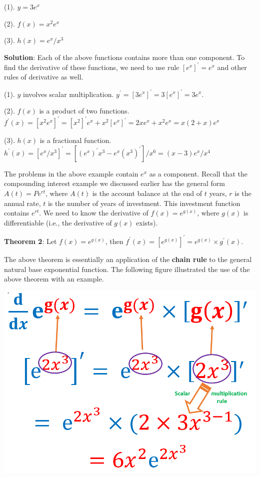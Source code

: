 \documentclass[
]{book}
\begin{document}
(1). \(y = 3e^x\)

(2). \(f(x) = x^2e^x\)

(3). \(h(x) = e^x/x^3\)

\textbf{Solution}: Each of the above functions contains more than one component. To find the derivative of these functions, we need to use rule \([e^x]^\prime = e^x\) and other rules of derivative as well.

(1). \(y\) involves scalar multiplication. \(y^\prime = [3e^x]^\prime = 3[e^x]^\prime = 3e^x\).

(2). \(f(x)\) is a product of two functions. \(f^\prime(x) = [x^2e^x]^\prime = [x^2]^\prime e^x + x^2 [e^x]^\prime = 2xe^x + x^2e^x=x(2+x)e^x\)

(3). \(h(x)\) is a fractional function. \(h^\prime(x) = [e^x/x^3]^\prime = [(e^x)^\prime x^3 - e^x(x^3)^\prime]/x^6 = (x - 3)e^x/x^4\)

\hfill\break

The problems in the above example contain \(e^x\) as a component. Recall that the compounding interest example we discussed earlier has the general form \(A(t) = Pe^{rt}\), where \(A(t)\) is the account balance at the end of \(t\) years, \(r\) is the annual rate, \(t\) is the number of years of investment. This investment function contains \(e^{rt}\). We need to know the derivative of \(f(x) = e^{g(x)}\), where \(g(x)\) is differentiable (i.e., the derivative of \(g(x)\) exists).

\textbf{Theorem 2}: Let \(f(x) = e^{g(x)}\), then \(f^\prime(x) = [e^{g(x)}]^\prime = e^{g(x)}\times g^\prime(x)\).

\hfill\break

The above theorem is essentially an application of the \textbf{chain rule} to the general natural base exponential function. The following figure illustrated the use of the above theorem with an example.

\hfill\break

\begin{center}\includegraphics[width=0.7\linewidth]{img05/w05-derivativeCompositeExp} \end{center}
\end{document}
